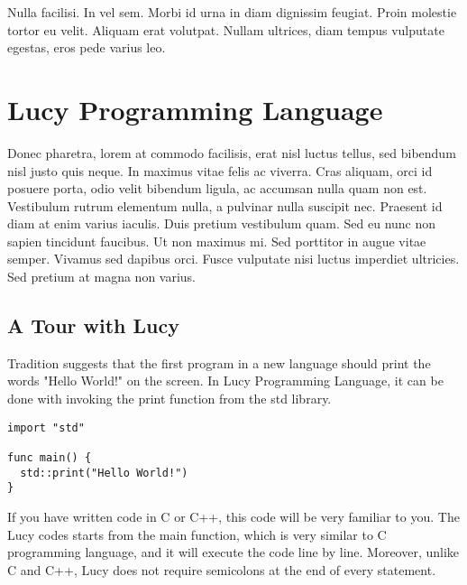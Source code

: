 \begin{savequote}[75mm]
Nulla facilisi. In vel sem. Morbi id urna in diam dignissim feugiat. Proin molestie tortor eu velit. Aliquam erat volutpat. Nullam ultrices, diam tempus vulputate egestas, eros pede varius leo.
\end{savequote}

\chapter{Lucy Programming Language}
Donec pharetra, lorem at commodo facilisis, erat nisl luctus tellus, sed bibendum nisl justo quis neque. In maximus vitae felis ac viverra. Cras aliquam, orci id posuere porta, odio velit bibendum ligula, ac accumsan nulla quam non est. Vestibulum rutrum elementum nulla, a pulvinar nulla suscipit nec. Praesent id diam at enim varius iaculis. Duis pretium vestibulum quam. Sed eu nunc non sapien tincidunt faucibus. Ut non maximus mi. Sed porttitor in augue vitae semper. Vivamus sed dapibus orci. Fusce vulputate nisi luctus imperdiet ultricies. Sed pretium at magna non varius.


\section{A Tour with Lucy}
Tradition suggests that the first program in a new language should print the words "Hello World!" on the screen. In Lucy Programming Language, it can be done with invoking the print function from the std library.
\begin{lstlisting}
import "std"

func main() {
  std::print("Hello World!")
}
\end{lstlisting}
If you have written code in C or C++, this code will be very familiar to you. The Lucy codes starts from the main function, which is very similar to C programming language, and it will execute the code line by line. Moreover, unlike C and C++, Lucy does not require semicolons at the end of every statement.

